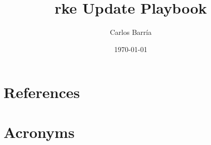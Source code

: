 \documentclass[PMO,authoryear,toc]{lsstdoc}
\title{rke Update Playbook}
\author{%
Carlos Barr\'ia
}
\date{\today}
\begin{document}
\maketitle



\appendix
\section{References} \label{sec:bib}
\renewcommand{\refname}{} %


\section{Acronyms} \label{sec:acronyms}

\end{document}
